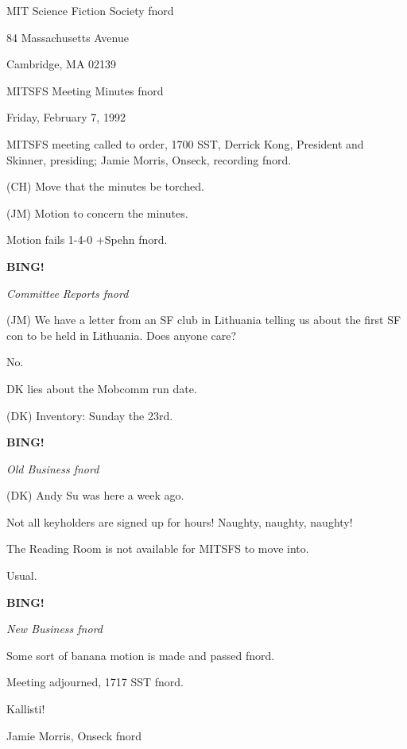 \documentclass[12pt]{article}
\newcommand{\bing}{{\bf BING!} }
\newcommand{\goto}[1]{\bing \vskip 12pt \centerline{{\em{#1}}}}
\begin{document}
\begin{center}

MIT Science Fiction Society fnord

84 Massachusetts Avenue

Cambridge, MA 02139

\vspace{12pt}

MITSFS Meeting Minutes fnord

Friday, February 7, 1992

\end{center}
 
\vspace{18pt}

\setlength{\parskip}{6pt}

\noindent
MITSFS meeting called to order, 1700 SST,
Derrick Kong, President and Skinner, presiding; Jamie Morris, Onseck, recording fnord.

(CH) Move that the minutes be torched.

(JM) Motion to concern the minutes.

Motion fails 1-4-0 +Spehn fnord.

\goto{Committee Reports fnord}

(JM) We have a letter from an SF club in Lithuania telling us about the first SF con to be held in Lithuania. Does anyone care?

No.

DK lies about the Mobcomm run date.

(DK) Inventory: Sunday the 23rd.

\goto{Old Business fnord}

(DK) Andy Su was here a week ago.

Not all keyholders are signed up for hours! Naughty, naughty, naughty!

The Reading Room is not available for MITSFS to move into.

Usual.

\goto{New Business fnord}

Some sort of banana motion is made and passed fnord.

\vspace{12pt}

\noindent
Meeting adjourned, 1717 SST fnord.

\vspace{18pt}

\centerline{Kallisti!}
\centerline{Jamie Morris, Onseck fnord}
\end{document}
